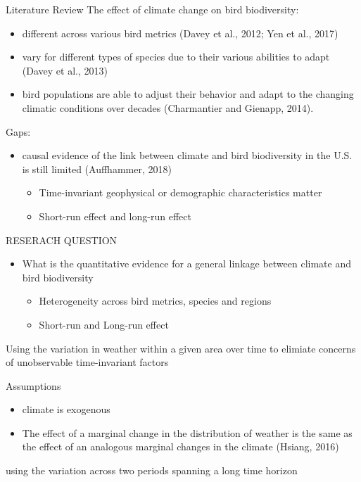 \documentclass{beamer}
\begin{document}
\begin{frame}{Literature Review}
  The effect of climate change on bird biodiversity:
\begin{itemize}
  \item different across various bird metrics (Davey et al., 2012; Yen et al., 2017)
  \item vary for different types of species due to their various abilities to adapt (Davey et al., 2013)
  \item bird populations are able to adjust their behavior and adapt to the changing climatic conditions over decades (Charmantier and Gienapp, 2014).
\end{itemize}
Gaps:
\begin{itemize}
  \item causal evidence of the link between climate and bird biodiversity in the U.S. is still limited (Auffhammer, 2018)
  \begin{itemize}
    \item Time-invariant geophysical or demographic characteristics matter
    \item Short-run effect and long-run effect
  \end{itemize}
\end{itemize}
\end{frame}


\begin{frame}{RESERACH QUESTION}
  \begin{itemize}
    \item What is the quantitative evidence for a general linkage between climate and bird biodiversity
    \begin{itemize}
      \item Heterogeneity across bird metrics, species and regions
      \item Short-run and Long-run effect
    \end{itemize}
  \end{itemize}
\end{frame}


     \item Using the variation in weather within a given area over time to elimiate concerns of unobservable time-invariant factors
     \begin{block}{Assumptions}
       \begin{itemize}
         \item climate is exogenous
         \item The effect of a marginal change in the distribution of weather is the same as the effect of an analogous marginal changes in the climate (Hsiang, 2016)
       \end{itemize}
     \end{block}
     \item using the variation across two periods spanning a long time horizon
\end{document}

